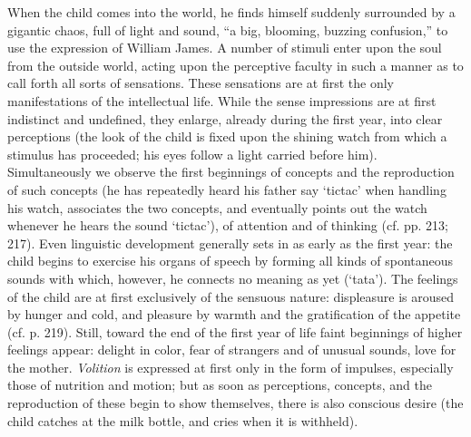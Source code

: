 When the child comes into the world, he finds himself suddenly surrounded by a gigantic chaos, full of light and sound, “a big, blooming, buzzing confusion,” to use the expression of William James. A number of stimuli enter upon the soul from the outside world, acting upon the perceptive faculty in such a manner as to call forth all sorts
of sensations. These sensations are at first the only manifestations of the intellectual life. While the sense impressions are at first indistinct and undefined, they enlarge, already during the first year, into clear perceptions (the look of the child is fixed upon the shining watch from which a stimulus has proceeded; his eyes follow a light carried before him). Simultaneously we observe the first beginnings of concepts and the reproduction of such concepts (he has repeatedly heard his father say ‘tictac’ when handling his watch, associates the two concepts, and eventually points out the watch whenever he hears the sound ‘tictac’), of attention and of thinking (cf. pp. 213; 217). Even linguistic development generally sets in as early as the first year: the child begins to exercise his organs of speech by forming all kinds of spontaneous sounds with which, however, he connects no meaning as yet (‘tata’). The feelings of the child are at first exclusively of the sensuous nature: displeasure is aroused by hunger and cold, and pleasure by warmth and the gratification of the appetite (cf. p. 219). Still, toward the end of the first year of life faint beginnings of higher feelings appear: delight in color, fear of strangers and of unusual sounds, love for the mother. \emph{Volition} is expressed at first only in the form of impulses, especially those of nutrition and motion; but as soon as perceptions, concepts, and the reproduction of these begin to show themselves, there is also conscious desire (the child catches at the milk bottle, and cries when it is withheld).


